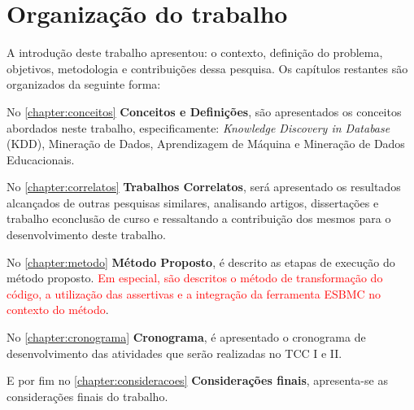 

\section{Organização do trabalho}
A introdução deste trabalho apresentou: o contexto, definição do problema, objetivos, metodologia e contribuições dessa pesquisa. Os capítulos restantes são organizados da seguinte forma:

\par
No \autoref{chapter:conceitos} \textbf{Conceitos e Definições}, são apresentados os conceitos abordados neste trabalho, especificamente: \textit{Knowledge Discovery in Database} (KDD), Mineração de Dados, Aprendizagem de Máquina e Mineração de Dados Educacionais.

\par
No \autoref{chapter:correlatos} \textbf{Trabalhos Correlatos}, será apresentado os resultados alcançados de outras pesquisas similares, analisando artigos, dissertações e trabalho econclusão de curso e ressaltando a contribuição dos mesmos para o desenvolvimento deste trabalho.

\par
No \autoref{chapter:metodo} \textbf{Método Proposto}, é descrito as etapas de execução do método proposto. \textcolor{red}{Em especial, são descritos o método de transformação do código, a utilização das assertivas e a integração da ferramenta ESBMC no contexto do método}.

\par
No \autoref{chapter:cronograma} \textbf{Cronograma}, é apresentado o cronograma de desenvolvimento das atividades que serão realizadas no TCC I e II. %
\par
E por fim no \autoref{chapter:consideracoes} \textbf{Considerações finais}, apresenta-se as considerações finais do trabalho. 
